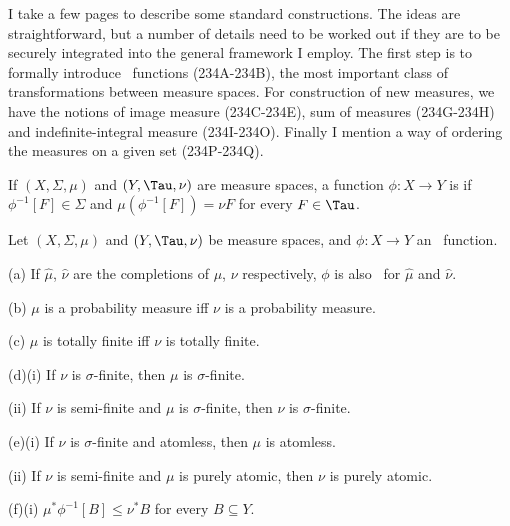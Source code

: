 
\def\chaptername{The Radon-Nikod\'ym theorem}
\def\sectionname{Operations on measures}


I take a few pages to describe some standard constructions.   The ideas are
straightforward, but a number of details need to be worked
out if they are to be securely integrated into the general framework I
employ.   The first step is to formally introduce \imp\ functions
(234A-234B), the most important class of transformations between measure
spaces.   For construction of new measures, we have the notions of
image measure (234C-234E), %
sum of measures (234G-234H) and indefinite-integral measure
(234I-234O).  %
Finally I mention a way of ordering the measures on a given set
(234P-234Q).


   If $(X,\Sigma,\mu)$ and $(Y,\Tau,\nu)$ are measure
spaces, a function $\phi:X\to Y$ is {\bf \imp} if
$\phi^{-1}[F]\in\Sigma$ and $\mu(\phi^{-1}[F])=\nu F$ for every
$F\in\Tau$.

 Let $(X,\Sigma,\mu)$ and $(Y,\Tau,\nu)$ be
measure spaces, and $\phi:X\to Y$ an \imp\ function.


(a) If $\hat\mu$, $\hat\nu$ are the completions of 
$\mu$, $\nu$
respectively, $\phi$ is also \imp\ for $\hat\mu$ and $\hat\nu$.

(b) $\mu$ is a probability measure iff $\nu$ is a probability measure.

(c)
 $\mu$ is totally finite iff $\nu$ is totally finite.

(d)(i)
If $\nu$ is $\sigma$-finite, then $\mu$ is $\sigma$-finite.

\quad(ii) If $\nu$ is semi-finite and $\mu$ is $\sigma$-finite, then $\nu$
is $\sigma$-finite.

(e)(i)
If $\nu$ is $\sigma$-finite and atomless, then $\mu$ is atomless.

\quad(ii) If $\nu$ is semi-finite and $\mu$ is purely atomic, then
$\nu$ is purely atomic.

(f)(i) $\mu^*\phi^{-1}[B]\le\nu^*B$ for
every $B\subseteq Y$.

